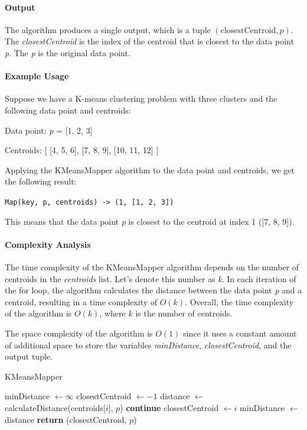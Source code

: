 \documentclass[parskip=full]{report}
\begin{document}
\paragraph{Output}
The algorithm produces a single output, which is a tuple \((\text{closestCentroid}, p)\). The \textit{closestCentroid} is the index of the centroid that is closest to the data point \textit{p}. The \textit{p} is the original data point.

\paragraph{Example Usage}
Suppose we have a K-means clustering problem with three clusters and the following data point and centroids:

Data point: \textit{p} = [1, 2, 3]

Centroids: [ [4, 5, 6], [7, 8, 9], [10, 11, 12] ]

Applying the KMeansMapper algorithm to the data point and centroids, we get the following result:

\texttt{Map(key, p, centroids) -> (1, [1, 2, 3])}

This means that the data point \textit{p} is closest to the centroid at index 1 ([7, 8, 9]).

\paragraph{Complexity Analysis}
The time complexity of the KMeansMapper algorithm depends on the number of centroids in the \textit{centroids} list. Let's denote this number as \textit{k}. In each iteration of the for loop, the algorithm calculates the distance between the data point \textit{p} and a centroid, resulting in a time complexity of \(O(k)\). Overall, the time complexity of the algorithm is \(O(k)\), where \(k\) is the number of centroids.

The space complexity of the algorithm is \(O(1)\) since it uses a constant amount of additional space to store the variables \textit{minDistance}, \textit{closestCentroid}, and the output tuple.


	\begin{algorithm}
		\caption{KMeansMapper}
		\begin{algorithmic}[1]


			\State minDistance $\gets \infty$
			\State closestCentroid $\gets -1$
			\State distance $\gets$ calculateDistance(centroids[$i$], $p$)
			\State \textbf{continue}
			\EndIf
			\State closestCentroid $\gets i$
			\State minDistance $\gets$ distance
			\EndFor
			\State \textbf{return} (closestCentroid, $p$)

			\EndProcedure
		\end{algorithmic}
	\end{algorithm}
\end{document}
